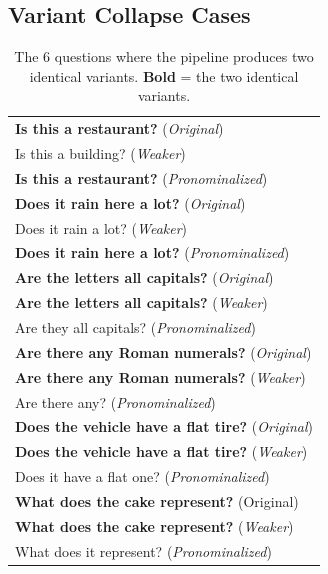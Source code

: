\documentclass[letterpaper]{article} %
\begin{document}
\clearpage
\begin{table}[h]
\subsection{Variant Collapse Cases}
\label{app:collapsed_variants}
\centering
\setlength{\tabcolsep}{4pt}
\renewcommand{\arraystretch}{1.1}
\label{tab:collapsed_variants}
\begin{tabular}{p{}}
\toprule
\textbf{Is this a restaurant?} (\textit{Original}) \\
\quad Is this a building? (\textit{Weaker}) \\
\quad \textbf{Is this a restaurant?} (\textit{Pronominalized}) \\[4pt]
\textbf{Does it rain here a lot?} (\textit{Original}) \\
\quad Does it rain a lot? (\textit{Weaker}) \\
\quad \textbf{Does it rain here a lot?} (\textit{Pronominalized}) \\[4pt]
\textbf{Are the letters all capitals?} (\textit{Original}) \\
\quad \textbf{Are the letters all capitals?} (\textit{Weaker}) \\
\quad Are they all capitals? (\textit{Pronominalized}) \\[4pt]
\textbf{Are there any Roman numerals?} (\textit{Original}) \\
\quad \textbf{Are there any Roman numerals?} (\textit{Weaker}) \\
\quad Are there any? (\textit{Pronominalized}) \\[4pt]
\textbf{Does the vehicle have a flat tire?} (\textit{Original}) \\
\quad \textbf{Does the vehicle have a flat tire?} (\textit{Weaker}) \\
\quad Does it have a flat one? (\textit{Pronominalized}) \\[4pt]
\textbf{What does the cake represent?} (Original) \\
\quad \textbf{What does the cake represent?} (\textit{Weaker}) \\
\quad What does it represent? (\textit{Pronominalized}) \\
\bottomrule
\end{tabular}
\caption{The 6 questions where the pipeline produces two identical variants. \textbf{Bold} = the two identical variants.}
\end{table}

\end{document}
